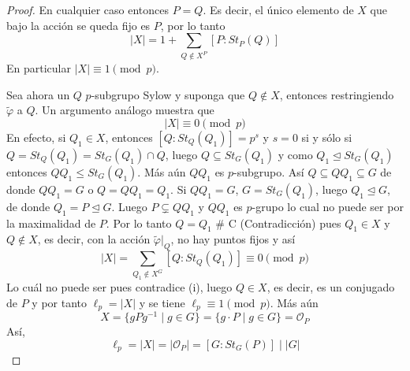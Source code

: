 \begin{proof}
    En cualquier caso entonces $P=Q$. Es decir, el único elemento de $X$ que bajo la acción se queda fijo es $P$, por lo tanto
    \begin{equation*}
        |X| = 1 + \sum_{Q \notin X^P} [P : St_P(Q)]
    \end{equation*}
    En particular $|X| \equiv 1 \pmod p$.

    Sea ahora un $Q$ $p$-subgrupo Sylow y suponga que $Q \notin X$, entonces restringiendo $\tilde{\varphi}$ a $Q$. Un argumento análogo muestra que
    \begin{equation*}
        |X| \equiv 0 \pmod p
    \end{equation*}
    En efecto, si $Q_1 \in X$, entonces $[Q : St_Q(Q_1)] = p^s$ y $s=0$ si y sólo si $Q = St_Q(Q_1) = St_G(Q_1) \cap Q$, luego $Q \subseteq St_G(Q_1)$ y como $Q_1 \trianglelefteq St_G(Q_1)$ entonces $QQ_1 \le St_G(Q_1)$.
    Más aún $QQ_1$ es $p$-subgrupo. Así $Q \subseteq QQ_1 \subseteq G$ de donde $QQ_1 = G$ o $Q = QQ_1 = Q_1$.
    Si $QQ_1 = G$, $G = St_G(Q_1)$, luego $Q_1 \trianglelefteq G$, de donde $Q_1 = P \trianglelefteq G$.
    Luego $P \subsetneq QQ_1$ y $QQ_1$ es $p$-grupo lo cual no puede ser por la maximalidad de $P$. Por lo tanto $Q=Q_1$ \# C (Contradicción) pues $Q_1 \in X$ y $Q \notin X$, es decir, con la acción $\tilde{\varphi}|_Q$, no hay puntos fijos y así
    \begin{equation*}
        |X| = \sum_{Q_1 \notin X^G} [Q : St_Q(Q_1)] \equiv 0 \pmod p
    \end{equation*}
    Lo cuál no puede ser pues contradice (i), luego $Q \in X$, es decir, es un conjugado de $P$ y por tanto $\ell_p = |X|$ y se tiene $\ell_p \equiv 1 \pmod p$. Más aún
    \begin{equation*}
        X = \{ gPg^{-1} \mid g \in G \} = \{ g \cdot P \mid g \in G \} = \mathcal{O}_P
    \end{equation*}
    Así,
    \begin{equation*}
        \ell_p = |X| = |\mathcal{O}_P| = [G : St_G(P)] \mid |G|
    \end{equation*}
\end{proof}


